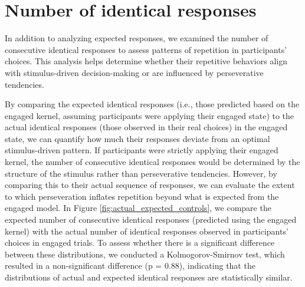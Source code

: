 \section{Number of identical responses} 
In addition to analyzing expected responses, we examined the number of consecutive identical responses to assess patterns of repetition in participants’ choices. This analysis helps determine whether their repetitive behaviors align with stimulus-driven decision-making or are influenced by perseverative tendencies.

By comparing the expected identical responses (i.e., those predicted based on the engaged kernel, assuming participants were applying their engaged state) to the actual identical responses (those observed in their real choices) in the engaged state, we can quantify how much their responses deviate from an optimal stimulus-driven pattern. If participants were strictly applying their engaged kernel, the number of consecutive identical responses would be determined by the structure of the stimulus rather than perseverative tendencies. However, by comparing this to their actual sequence of responses, we can evaluate the extent to which perseveration inflates repetition beyond what is expected from the engaged model.\newline
In Figure \ref{fig:actual_expected_controls}, we compare the expected number of consecutive identical responses (predicted using the engaged kernel) with the actual number of identical responses observed in participants' choices in engaged trials. To assess whether there is a significant difference between these distributions, we conducted a Kolmogorov-Smirnov test, which resulted in a non-significant difference (p = 0.88), indicating that the distributions of actual and expected identical responses are statistically similar.

